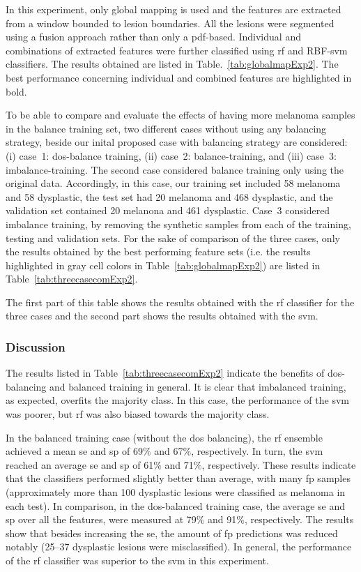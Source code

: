 In this experiment, only global mapping is used and the features are extracted from a window bounded to lesion boundaries.
All the lesions were segmented using a fusion approach rather than only a \ac{pdf}-based.
Individual and combinations of extracted features were further classified using \ac{rf} and RBF-\ac{svm} classifiers.
The results obtained are listed in Table.~\ref{tab:globalmapExp2}.
The best performance concerning individual and combined features are highlighted in bold.

To be able to compare and evaluate the effects of having more melanoma samples in the balance training set, two different cases without using any balancing strategy, beside our inital proposed case with balancing strategy are considered:
(i) case~1: \ac{dos}-balance training, (ii) case~2: balance-training, and (iii) case~3: imbalance-training.
The second case considered balance training only using the original data.
Accordingly, in this case, our training set included 58 melanoma and 58 dysplastic, the test set had 20 melanoma and 468 dysplastic, and the validation set contained 20 melanona and 461 dysplastic.
Case~3 considered imbalance training, by removing the synthetic samples from each of the training, testing and validation sets.
For the sake of comparison of the three cases, only the results obtained by the best performing feature sets (i.e. the results highlighted in gray cell colors in Table~\ref{tab:globalmapExp2}) are listed in Table~\ref{tab:threecasecomExp2}.

The first part of this table shows the results obtained with the \ac{rf} classifier for the three cases and the second part shows the results obtained with the \ac{svm}.


\subsubsection{Discussion}
The results listed in Table~\ref{tab:threecasecomExp2} indicate the benefits of \ac{dos}-balancing and balanced training in general.
It is clear that imbalanced training, as expected, overfits the majority class. 
In this case, the performance of the \ac{svm} was poorer, but \ac{rf} was also biased towards the majority class.

In the balanced training case (without the \ac{dos} balancing), the \ac{rf} ensemble achieved a mean \ac{se} and \ac{sp} of 69$\%$ and 67$\%$, respectively. 
In turn, the \acs{svm} reached an average \ac{se} and \ac{sp} of 61$\%$ and 71$\%$, respectively. 
These results indicate that the classifiers performed slightly better than average, with many  \acf{fp} samples (approximately more than 100 dysplastic lesions were classified as melanoma in each test). 
In comparison, in the \ac{dos}-balanced training case, the average \ac{se} and \ac{sp} over all the features, were measured at 79$\%$ and 91$\%$, respectively.
The results show that besides increasing the \ac{se}, the amount of \ac{fp} predictions was reduced notably (25--37 dysplastic lesions were misclassified). 
In general, the performance of the \ac{rf} classifier was superior to the \ac{svm} in this experiment.


